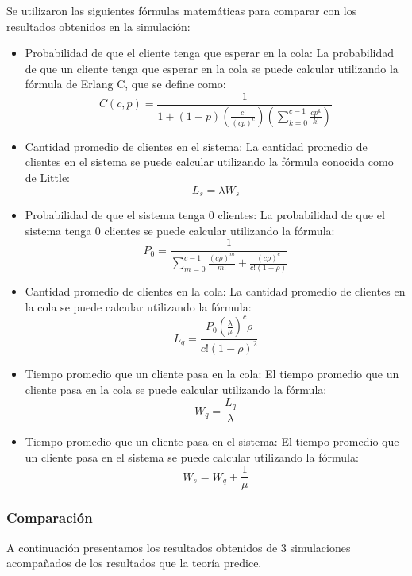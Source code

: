 \documentclass[11pt]{article}
\begin{document}
    Se utilizaron las siguientes fórmulas matemáticas para comparar con los resultados obtenidos en la simulación:
    \begin{itemize}
        \item Probabilidad de que el cliente tenga que esperar en la cola: La probabilidad de que un cliente tenga que esperar en la cola se puede calcular utilizando la fórmula de Erlang C, que se define como:
        $$ C(c, p) = \frac{1}{1 +  (1 - p) (\frac{c!}{(cp)^c}) (\sum_{k=0}^{c-1} \frac{cp^k}{k!}) } $$
        \item Cantidad promedio de clientes en el sistema: La cantidad promedio de clientes en el sistema se puede calcular utilizando la fórmula conocida como de Little:
        $$ L_s = \lambda W_s$$
        \item Probabilidad de que el sistema tenga 0 clientes: La probabilidad de que el sistema tenga 0 clientes se puede calcular utilizando la fórmula:
        $$ P_0 = \frac{1}{\sum_{m=0}^{c-1} \frac{(c\rho)^m}{m!} + \frac{(c\rho)^c}{c!(1-\rho)}}$$
        \item Cantidad promedio de clientes en la cola: La cantidad promedio de clientes en la cola se puede calcular utilizando la fórmula:
        $$ L_q = \frac{P_0(\frac{\lambda}{\mu})^c\rho}{c!(1-\rho)^2} $$
        \item Tiempo promedio que un cliente pasa en la cola: El tiempo promedio que un cliente pasa en la cola se puede calcular utilizando la fórmula:
        $$ W_q = \frac{L_q}{\lambda} $$
        \item Tiempo promedio que un cliente pasa en el sistema: El tiempo promedio que un cliente pasa en el sistema se puede calcular utilizando la fórmula:
        $$ W_s = W_q + \frac{1}{\mu} $$

    \end{itemize}

    \subsubsection{Comparación}

    A continuación presentamos los resultados obtenidos de 3 simulaciones acompañados de los resultados que la teoría predice.
\end{document}
